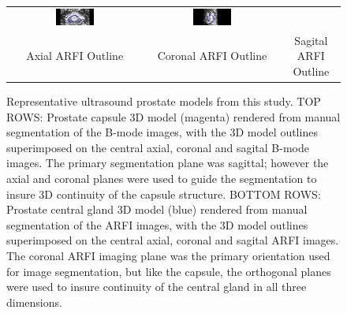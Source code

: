 \begin{figure}[htb!]
\begin{tabular}{ccc}
\includegraphics[width=0.3\textwidth]{zach/CG_Modeling_Images/Coronal_CG.png} &
\includegraphics[width=0.3\textwidth]{zach/CG_Modeling_Images/Sagittal_CG.png} \\
Axial ARFI Outline & Coronal ARFI Outline & Sagital ARFI Outline \\
\end{tabular}
\caption{Representative ultrasound prostate models from this study.  TOP ROWS:
    Prostate capsule 3D model (magenta) rendered from manual segmentation of
    the B-mode images, with the 3D model outlines superimposed on the central
    axial, coronal and sagital B-mode images.  The primary segmentation plane
    was sagittal; however the axial and coronal planes were used to guide the
    segmentation to insure 3D continuity of the capsule structure.  BOTTOM
    ROWS: Prostate central gland 3D model (blue) rendered from manual
    segmentation of the ARFI images, with the 3D model outlines superimposed on
    the central axial, coronal and sagital ARFI images.  The coronal ARFI
    imaging plane was the primary orientation used for image segmentation, but
    like the capsule, the orthogonal planes were used to insure continuity of
    the central gland in all three dimensions.}
\label{fig:arfi_segs} 
\end{figure}
